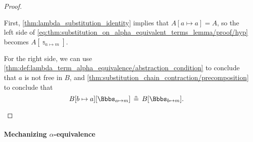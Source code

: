 \begin{proof}
\begin{itemize}
    First, \cref{thm:lambda_substitution_identity} implies that \( A[a \mapsto a] = A \), so the left side of \eqref{eq:thm:substitution_on_alpha_equivalent_terms_lemma/proof/hyp} becomes \( A[\Bbbs_{a \mapsto m}] \).

    For the right side, we can use \cref{thm:def:lambda_term_alpha_equivalence/abstraction_condition} to conclude that \( a \) is not free in \( B \), and \cref{thm:substitution_chain_contraction/precomposition} to conclude that
    \begin{equation*}
      B[b \mapsto a][\Bbbs_{a \mapsto m}] \aequiv B[\Bbbs_{b \mapsto m}].
    \end{equation*}
  \end{itemize}
\end{proof}

\paragraph{Mechanizing \( \alpha \)-equivalence}

